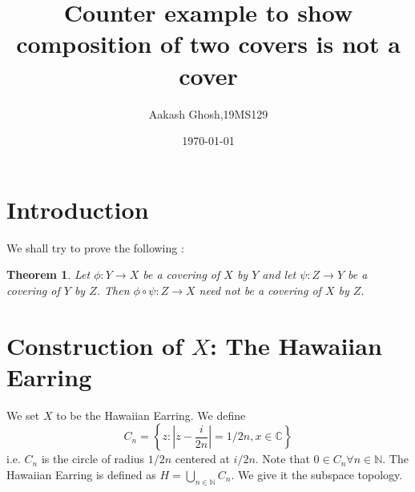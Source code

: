 \documentclass[twocolumn]{article}
\title{Counter example to show composition of two covers is not a cover}
\author{Aakash Ghosh,19MS129}
\date{\today}
\newtheorem{theorem}{Theorem}
\begin{document}
\maketitle

\section{Introduction}
We shall try to prove the following :
\begin{theorem}
		Let $\phi:Y\to X$ be a covering of $X$ by $Y$ and let $\psi:Z\to Y$ be a covering of $Y$ by $Z$. Then $\phi\circ\psi:Z\to X$ need not be a covering of $X$ by $Z$.
\end{theorem}


\section{Construction of $X$: The Hawaiian Earring}
We set $X$ to be the Hawaiian Earring. 
We define  {$$C_n=\left\{z:\left|z-\frac{i}{2n}\right|=1/2n,x\in\mathbb{C}\right\}$$}i.e. $C_n$ is the circle of radius $1/2n$ centered at $i/2n$. Note that $0\in C_n\forall n\in\mathbb N$. The Hawaiian Earring is defined as  {$H=\bigcup_{n\in\mathbb N}C_n$}. We give it the subspace topology. 
\end{document}
